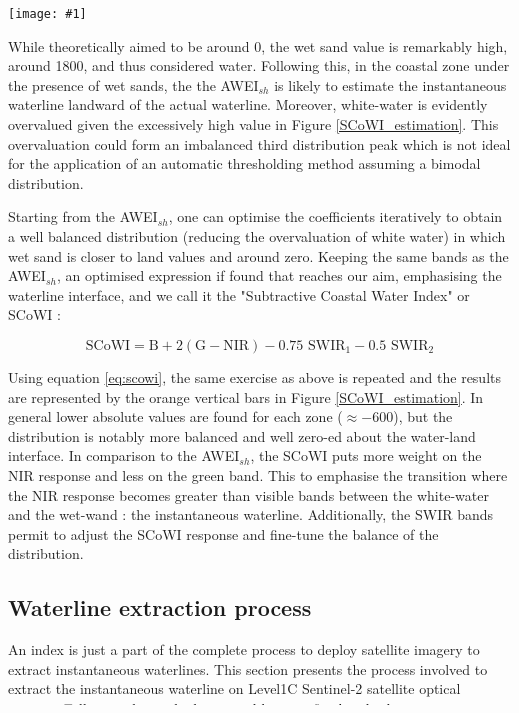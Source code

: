 \documentclass[remotesensing,article,submit,pdftex,moreauthors]{Definitions/mdpi}
\newcommand{\myfigure}[4]{
    \begin{figure*}[ht!]
        \centering
        \texttt{[image: \#1]}	 
        \caption{\itshape#2}
        \label{#3}
    \end{figure*} 
}
\begin{document}
\myfigure{img/SCoWI_optimisation.png}{Comparison of the estimated values of the SCoWI (orange bars) against the AWEI$_{sh}$ (blue bars) over the 5 areas of the intertidal zone. The SCoWI has lower estimated values than AWEI$_{sh}$ on the white-water and wet sand area, optimising the extraction of the waterline.}{SCoWI_estimation}{0.5}

While theoretically aimed to be around 0, the wet sand value is remarkably high, around 1800, and thus considered water. Following this, in the coastal zone under the presence of wet sands, the the AWEI$_{sh}$ is likely to estimate the instantaneous waterline landward of the actual waterline. Moreover, white-water is evidently overvalued given the excessively high value in Figure \ref{SCoWI_estimation}. This overvaluation could form an imbalanced third distribution peak which is not ideal for the application of an automatic thresholding method assuming a bimodal distribution.

Starting from the AWEI$_{sh}$, one can optimise the coefficients iteratively to obtain a well balanced distribution (reducing the overvaluation of white water) in which wet sand is closer to land values and around zero. Keeping the same bands as the AWEI$_{sh}$, an optimised expression if found that reaches our aim, emphasising the waterline interface, and we call it the "Subtractive Coastal Water Index" or SCoWI : 

\begin{equation}
    \textrm{SCoWI} = \textrm{B} + 2(\textrm{G} - \textrm{NIR}) - 0.75 \textrm{ SWIR$_{1}$} - 0.5 \textrm{ SWIR$_{2}$}
    \label{eq:scowi}
\end{equation}

Using equation \ref{eq:scowi}, the same exercise as above is repeated and the results are represented by the orange vertical bars in Figure \ref{SCoWI_estimation}. In general lower absolute values are found for each zone ($\approx -600$), but the distribution is notably more balanced and well zero-ed about the water-land interface. In comparison to the AWEI$_{sh}$, the SCoWI puts more weight on the NIR response and less on the green band. This to emphasise the transition where the NIR response becomes greater than visible bands between the white-water and the wet-wand : the instantaneous waterline. Additionally, the SWIR bands permit to adjust the SCoWI response and fine-tune the balance of the distribution.
        
\subsection{Waterline extraction process}\label{extract_process}
An index is just a part of the complete process to deploy satellite imagery to extract instantaneous waterlines. This section presents the process involved to extract the instantaneous waterline on Level1C Sentinel-2 satellite optical imagery. Following the method proposed by \citep{Bishop_sub_pixel}, a refined and robust process using the SCoWI presented before and a new histogram threhsolding procedure extracting sub pixel waterline is described.
\end{document}
